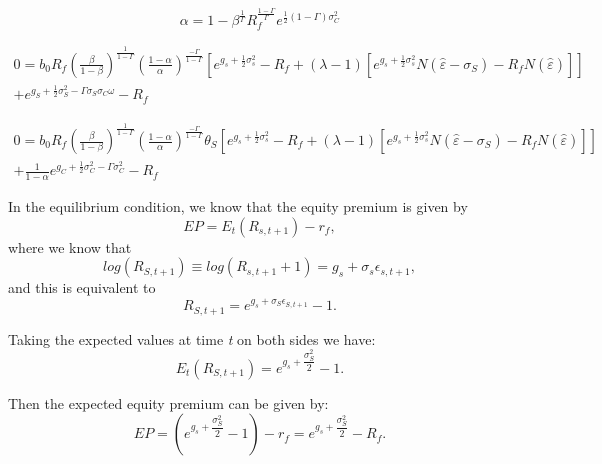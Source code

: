 \documentclass[ukenglish,nottitlepage,thmsb,11pt,letterpaper]{article}
\begin{document}
\begin{equation}
\alpha=1-\beta^{\frac{1}{\Gamma}}R_{f}^{\frac{1-\Gamma}{\Gamma}}e^{\frac{1}%
	{2}(1-\Gamma)\sigma_{C}^{2}}%
\end{equation}

\begin{multline}
0=b_{0}R_{f}\left(  \frac{\beta}{1-\beta}\right)  ^{\frac{1}{1-\Gamma}}\left(
\frac{1-\alpha}{\alpha}\right)  ^{\frac{-\Gamma}{1-\Gamma}}\left[
e^{g_{s}+\frac{1}{2}\sigma_{s}^{2}}-R_{f}+(\lambda-1) \left [ e^{g_{s}+\frac
	{1}{2}\sigma_{s}^{2}}N(\widehat{\varepsilon}-\sigma_{S})-R_{f}N(\widehat
{\varepsilon})\right]  \right] \\ + e^{g_{S}+\frac{1}{2}\sigma_{S}^{2}%
	-\Gamma\sigma_{S}\sigma_{C}\omega}-R_{f}%
\end{multline}


\begin{multline}
0=b_{0}R_{f}\left(  \frac{\beta}{1-\beta}\right)  ^{\frac{1}{1-\Gamma}}\left(
\frac{1-\alpha}{\alpha}\right)  ^{\frac{-\Gamma}{1-\Gamma}}\theta_{S}\left[
e^{g_{s}+\frac{1}{2}\sigma_{s}^{2}}-R_{f}+(\lambda-1)
\left[  e^{g_{s}+\frac
	{1}{2}\sigma_{s}^{2}}N(\widehat{\varepsilon}-\sigma_{S})-R_{f}N(\widehat
{\varepsilon})\right]  \right] \\
+\frac{1}{1-\alpha}e^{g_{C}+\frac{1}{2}%
	\sigma_{C}^{2}-\Gamma\sigma_{C}^{2}}-R_{f}
\end{multline}


In the equilibrium condition, we know that the equity premium is given by
\begin{equation*}
EP = E_t (R_{s,t+1}) - r_f,
\end{equation*}
where we know that
\begin{equation*}
log(R_{S,t+1}) \equiv log(R_{s,t+1} +1)　= g_s + \sigma_s \epsilon_{s,t+1},
\end{equation*}
and this is equivalent to
\begin{equation*}
R_{S,t+1} = e^{ g_s + \sigma_S \epsilon_{S,t+1}} - 1.
\end{equation*}
 
Taking the expected values at time \textit{t} on both sides we have:
\begin{equation*}
E_t (R_{S,t+1}) = e^{ g_s +  \dfrac{\sigma_S^2}{2}} - 1.
\end{equation*}

Then the expected equity premium can be given by:
\begin{equation*}
EP = (e^{ g_s + \dfrac{\sigma_S^2}{2}} - 1 ) -r_f = e^{ g_s + \dfrac{\sigma_S^2}{2}} - R_f.
\end{equation*}
\end{document}
